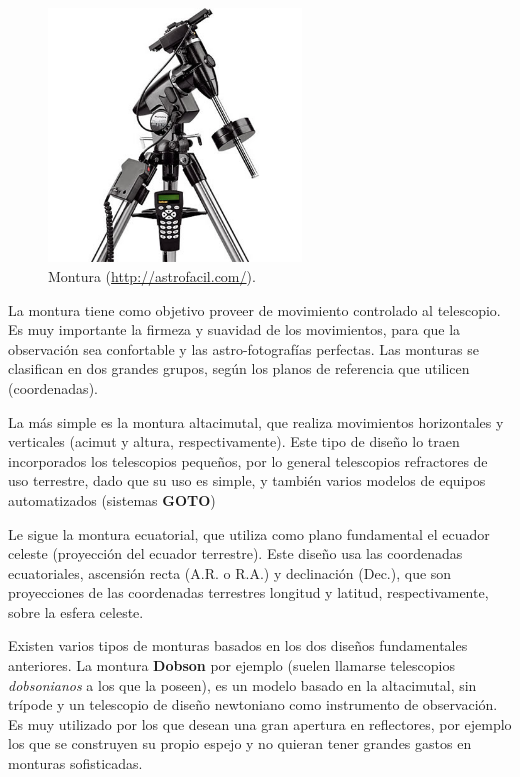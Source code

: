 \bigskip
\begin{figure}[!ht]
  \begin{center}
  \includegraphics[width=0.6\textwidth]{../images/montura.jpg}
  \caption[Montura]{Montura (\href{http://astrofacil.com/}{http://astrofacil.com/}).}
  \label{fig:diag_scrum}
  \end{center}
\end{figure}

\bigskip
La montura tiene como objetivo proveer de movimiento controlado al telescopio. Es muy importante la firmeza y suavidad de los movimientos, para que la observación sea confortable y las astro-fotografías perfectas. Las monturas se clasifican en dos grandes grupos, según los planos de referencia que utilicen (coordenadas).

\bigskip
La más simple es la montura altacimutal, que realiza movimientos horizontales y verticales (acimut y altura, respectivamente). Este tipo de diseño lo traen incorporados los telescopios pequeños, por lo general telescopios refractores de uso terrestre, dado que su uso es simple, y también varios modelos de equipos automatizados (sistemas \textbf{GOTO})

\bigskip
Le sigue la montura ecuatorial, que utiliza como plano fundamental el ecuador celeste (proyección del ecuador terrestre). Este diseño usa las coordenadas ecuatoriales, ascensión recta (A.R. o R.A.) y declinación (Dec.), que son proyecciones de las coordenadas terrestres longitud y latitud, respectivamente, sobre la esfera celeste.

\bigskip
Existen varios tipos de monturas basados en los dos diseños fundamentales anteriores. La montura \textbf{Dobson} por ejemplo (suelen llamarse telescopios \textit{dobsonianos} a los que la poseen), es un modelo basado en la altacimutal, sin trípode y un telescopio de diseño newtoniano como instrumento de observación. Es muy utilizado por los que desean una gran apertura en reflectores, por ejemplo los que se construyen su propio espejo y no quieran tener grandes gastos en monturas sofisticadas.

